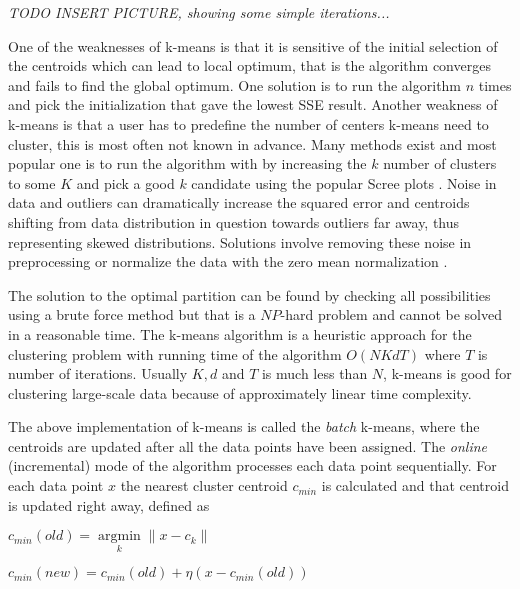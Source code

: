 \textit{TODO INSERT PICTURE, showing some simple iterations...}


One of the weaknesses of k-means is that it is sensitive of the initial selection of the centroids which can lead to local optimum, that is the algorithm converges and fails to find the global optimum. One solution is to run the algorithm $n$ times and pick the initialization that gave the lowest SSE result. Another weakness of k-means is that a user has to predefine the number of centers k-means need to cluster, this is most often not known in advance. Many methods exist and most popular one is to run the algorithm with by increasing the $k$ number of clusters to some $K$ and pick a good $k$ candidate using the popular Scree plots \citep{Han:2006DM}. Noise in data and outliers can dramatically increase the squared error and centroids shifting from data distribution in question towards outliers far away, thus representing skewed distributions. Solutions involve removing these noise in preprocessing or normalize the data with the zero mean normalization \citep{Xu:2005Clustering, Han:2006DM}.


The solution to the optimal partition can be found by checking all possibilities using a brute force method but that is a $NP$-hard problem \cite{Aloise:2009KmeansNPHard} and cannot be solved in a reasonable time. The k-means algorithm is a heuristic approach for the clustering problem with running time of the algorithm $O(NKdT)$ where $T$ is number of iterations. Usually $K,d$ and $T$ is much less than $N$, k-means is good for clustering large-scale data because of approximately linear time complexity.

The above implementation of k-means is called the \textit{batch} k-means, where the centroids are updated after all the data points have been assigned. The \textit{online} (incremental) mode of the algorithm processes each data point sequentially. For each data point $x$ the nearest cluster centroid $c_{min}$ is calculated and that centroid is updated right away, defined as 

\begin{center}
$c_{min}(old) = \underset{k}{\operatorname{argmin}} \|x-c_k\|$

$c_{min}(new) = c_{min}(old)+\eta(x-c_{min}(old))$
\end{center}

